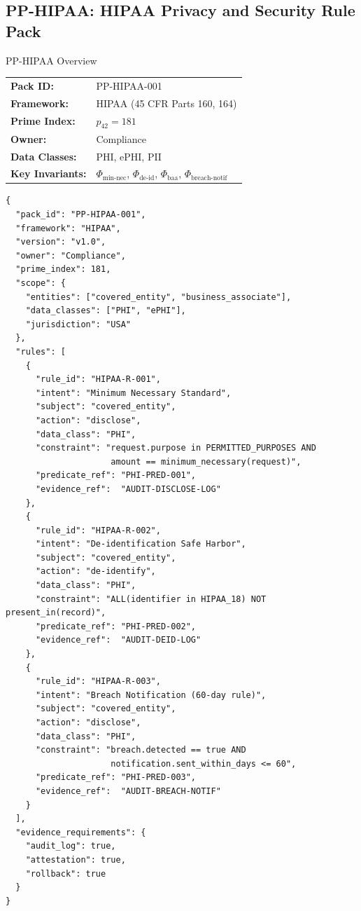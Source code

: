 \documentclass[12pt,letterpaper]{article}
\theoremstyle{definition}
\theoremstyle{plain}
\theoremstyle{remark}
\begin{document}
\subsection{PP-HIPAA: HIPAA Privacy and Security Rule Pack}

\begin{policybox}{PP-HIPAA Overview}
\begin{tabular}{ll}
\textbf{Pack ID:}     & PP-HIPAA-001 \\
\textbf{Framework:}   & HIPAA (45 CFR Parts 160, 164) \\
\textbf{Prime Index:} & $p_{42} = 181$ \\
\textbf{Owner:}       & Compliance \\
\textbf{Data Classes:} & PHI, ePHI, PII \\
\textbf{Key Invariants:} & $\Phi_{\text{min-nec}}$, $\Phi_{\text{de-id}}$, $\Phi_{\text{baa}}$, $\Phi_{\text{breach-notif}}$ \\
\end{tabular}
\end{policybox}

\begin{lstlisting}[style=jsonStyle, caption={PP-HIPAA-001 Policy Pack (excerpt)}]
{
  "pack_id": "PP-HIPAA-001",
  "framework": "HIPAA",
  "version": "v1.0",
  "owner": "Compliance",
  "prime_index": 181,
  "scope": {
    "entities": ["covered_entity", "business_associate"],
    "data_classes": ["PHI", "ePHI"],
    "jurisdiction": "USA"
  },
  "rules": [
    {
      "rule_id": "HIPAA-R-001",
      "intent": "Minimum Necessary Standard",
      "subject": "covered_entity",
      "action": "disclose",
      "data_class": "PHI",
      "constraint": "request.purpose in PERMITTED_PURPOSES AND
                     amount == minimum_necessary(request)",
      "predicate_ref": "PHI-PRED-001",
      "evidence_ref":  "AUDIT-DISCLOSE-LOG"
    },
    {
      "rule_id": "HIPAA-R-002",
      "intent": "De-identification Safe Harbor",
      "subject": "covered_entity",
      "action": "de-identify",
      "data_class": "PHI",
      "constraint": "ALL(identifier in HIPAA_18) NOT present_in(record)",
      "predicate_ref": "PHI-PRED-002",
      "evidence_ref":  "AUDIT-DEID-LOG"
    },
    {
      "rule_id": "HIPAA-R-003",
      "intent": "Breach Notification (60-day rule)",
      "subject": "covered_entity",
      "action": "disclose",
      "data_class": "PHI",
      "constraint": "breach.detected == true AND
                     notification.sent_within_days <= 60",
      "predicate_ref": "PHI-PRED-003",
      "evidence_ref":  "AUDIT-BREACH-NOTIF"
    }
  ],
  "evidence_requirements": {
    "audit_log": true,
    "attestation": true,
    "rollback": true
  }
}
\end{lstlisting}
\end{document}
